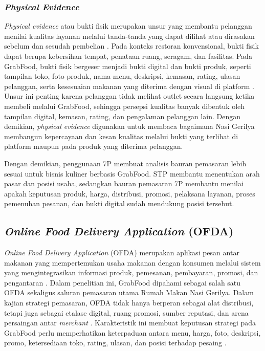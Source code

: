\subsubsection{\textit{Physical Evidence}}
\textit{Physical evidence} atau bukti fisik merupakan unsur yang membantu pelanggan menilai kualitas layanan melalui tanda-tanda yang dapat dilihat atau dirasakan sebelum dan sesudah pembelian \parencite{wirtz2024servicesmarketing}. Pada konteks restoran konvensional, bukti fisik dapat berupa kebersihan tempat, penataan ruang, seragam, dan fasilitas. Pada GrabFood, bukti fisik bergeser menjadi bukti digital dan bukti produk, seperti tampilan toko, foto produk, nama menu, deskripsi, kemasan, rating, ulasan pelanggan, serta kesesuaian makanan yang diterima dengan visual di platform \parencite{sophia2025rendanggadih,khairani2022buahsayur,ruhiyat2023minatbeli}. Unsur ini penting karena pelanggan tidak melihat outlet secara langsung ketika membeli melalui GrabFood, sehingga persepsi kualitas banyak dibentuk oleh tampilan digital, kemasan, rating, dan pengalaman pelanggan lain. Dengan demikian, \textit{physical evidence} digunakan untuk membaca bagaimana Nasi Gerilya membangun kepercayaan dan kesan kualitas melalui bukti yang terlihat di platform maupun pada produk yang diterima pelanggan.


\resetindent
Dengan demikian, penggunaan 7P membuat analisis bauran pemasaran lebih sesuai untuk bisnis kuliner berbasis GrabFood. STP membantu menentukan arah pasar dan posisi usaha, sedangkan bauran pemasaran 7P membantu menilai apakah keputusan produk, harga, distribusi, promosi, pelaksana layanan, proses pemenuhan pesanan, dan bukti digital sudah mendukung posisi tersebut.

\subsection{\textit{Online Food Delivery Application} (OFDA)}
\textit{Online Food Delivery Application} (OFDA) merupakan aplikasi pesan antar makanan yang mempertemukan usaha makanan dengan konsumen melalui sistem yang mengintegrasikan informasi produk, pemesanan, pembayaran, promosi, dan pengantaran \parencite{chaffey2022digitalmarketing,khairani2022buahsayur}. Dalam penelitian ini, GrabFood dipahami sebagai salah satu OFDA sekaligus saluran pemasaran utama Rumah Makan Nasi Gerilya. Dalam kajian strategi pemasaran, OFDA tidak hanya berperan sebagai alat distribusi, tetapi juga sebagai etalase digital, ruang promosi, sumber reputasi, dan arena persaingan antar \textit{merchant} \parencite{chaffey2022digitalmarketing,sophia2025rendanggadih}. Karakteristik ini membuat keputusan strategi pada GrabFood perlu memperhatikan keterpaduan antara menu, harga, foto, deskripsi, promo, ketersediaan toko, rating, ulasan, dan posisi terhadap pesaing \parencite{sophia2025rendanggadih,khairani2022buahsayur}.

